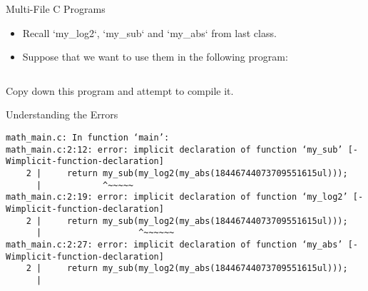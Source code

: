 \documentclass[hyphens,aspectratio=169,dvipsnames]{beamer}
\begin{document}
\begin{frame}[fragile]{Multi-File C Programs}
    \begin{itemize}
        \pause \item Recall `my\_log2`, `my\_sub` and `my\_abs` from last class.
        \pause \item Suppose that we want to use them in the following program:
    \end{itemize}
    \inputminted{c}{math_main.c}

    \begin{center} Copy down this program and attempt to compile it. \end{center}
\end{frame}


\begin{frame}[fragile]{Understanding the Errors}
    \begin{verbatim}
math_main.c: In function ‘main’:
math_main.c:2:12: error: implicit declaration of function ‘my_sub’ [-Wimplicit-function-declaration]
    2 |     return my_sub(my_log2(my_abs(18446744073709551615ul)));
      |            ^~~~~~
math_main.c:2:19: error: implicit declaration of function ‘my_log2’ [-Wimplicit-function-declaration]
    2 |     return my_sub(my_log2(my_abs(18446744073709551615ul)));
      |                   ^~~~~~~
math_main.c:2:27: error: implicit declaration of function ‘my_abs’ [-Wimplicit-function-declaration]
    2 |     return my_sub(my_log2(my_abs(18446744073709551615ul)));
      |
    \end{verbatim}
\end{frame}
\end{document}
